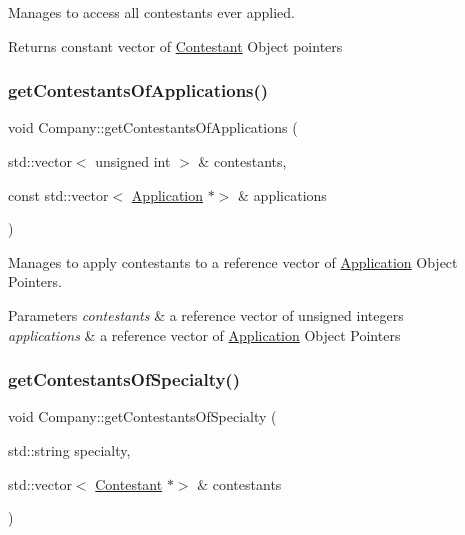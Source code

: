 Manages to access all contestants ever applied. 

\begin{DoxyReturn}{Returns}
constant vector of \hyperlink{class_contestant}{Contestant} Object pointers 
\end{DoxyReturn}
\mbox{\label{class_company_a84df3faac90c9fa0d966e381a6d7459c}} 
\subsubsection{\texorpdfstring{get\+Contestants\+Of\+Applications()}{getContestantsOfApplications()}}
{\footnotesize\ttfamily void Company\+::get\+Contestants\+Of\+Applications (\begin{DoxyParamCaption}\item[{std\+::vector$<$ unsigned int $>$ \&}]{contestants,  }\item[{const std\+::vector$<$ \hyperlink{class_application}{Application} $\ast$$>$ \&}]{applications }\end{DoxyParamCaption})}



Manages to apply contestants to a reference vector of \hyperlink{class_application}{Application} Object Pointers. 


\begin{DoxyParams}{Parameters}
{\em contestants} & a reference vector of unsigned integers \\
\hline
{\em applications} & a reference vector of \hyperlink{class_application}{Application} Object Pointers \\
\hline
\end{DoxyParams}
\mbox{\label{class_company_a64ff4709f2a3d567b1e2fd55f308a665}} 
\subsubsection{\texorpdfstring{get\+Contestants\+Of\+Specialty()}{getContestantsOfSpecialty()}}
{\footnotesize\ttfamily void Company\+::get\+Contestants\+Of\+Specialty (\begin{DoxyParamCaption}\item[{std\+::string}]{specialty,  }\item[{std\+::vector$<$ \hyperlink{class_contestant}{Contestant} $\ast$$>$ \&}]{contestants }\end{DoxyParamCaption})}



